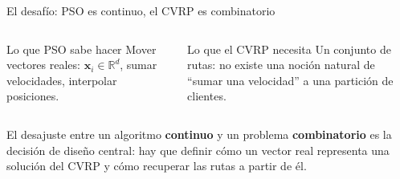 \documentclass[aspectratio=169, 11pt, xcolor={dvipsnames,table}]{beamer}
\newcommand{\azul}[1]{\textcolor{UsachAzul}{#1}}
\newcommand{\naranja}[1]{\textcolor{UsachNaranja}{#1}}
\newcommand{\xx}{\mathbf{x}_i}
\begin{document}
\begin{frame}{El desafío: PSO es continuo, el CVRP es combinatorio}
\begin{columns}[c]
\begin{block}{Lo que PSO sabe hacer}
\footnotesize
Mover \azul{vectores reales}: $\xx \in \mathbb{R}^d$, sumar velocidades, interpolar posiciones.
\end{block}
\begin{alertblock}{Lo que el CVRP necesita}
\footnotesize
Un conjunto de \naranja{rutas}: no existe una noción natural de ``sumar una velocidad'' a una partición de clientes.
\end{alertblock}
\centering
{}
\end{columns}
\vspace{6pt}
\begin{ideaclave}
\footnotesize
El desajuste entre un algoritmo \textbf{continuo} y un problema \textbf{combinatorio} es la decisión de diseño central: hay que definir cómo un vector real representa una solución del CVRP y cómo recuperar las rutas a partir de él.
\end{ideaclave}
\end{frame}
\end{document}

